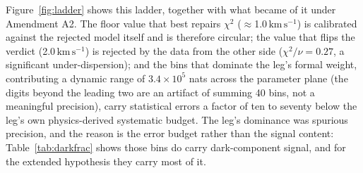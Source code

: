\documentclass[11pt]{article}
\newcommand{\kms}{\ensuremath{\mathrm{km\,s^{-1}}}}
\begin{document}
Figure~\ref{fig:ladder} shows this ladder, together with what became of it under Amendment A2. The floor value that best repairs $\chi^{2}$ ($\approx$1.0\,\kms) is calibrated against the rejected model itself and is therefore circular; the value that flips the verdict (2.0\,\kms) is rejected by the data from the other side ($\chi^{2}/\nu = 0.27$, a significant under-dispersion); and the bins that dominate the leg's formal weight, contributing a dynamic range of $3.4\times10^{5}$ nats across the parameter plane (the digits beyond the leading two are an artifact of summing 40 bins, not a meaningful precision), carry statistical errors a factor of ten to seventy below the leg's own physics-derived systematic budget. The leg's dominance was spurious precision, and the reason is the error budget rather than the signal content: Table~\ref{tab:darkfrac} shows those bins do carry dark-component signal, and for the extended hypothesis they carry most of it.
\end{document}
